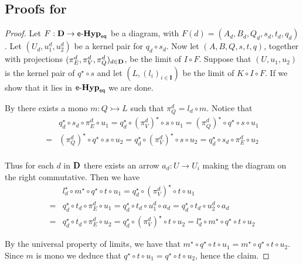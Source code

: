 \documentclass[3p]{elsarticle}
\newcommand{\cat}[1]{\ensuremath{\mathbf{#1}}}
\newcommand{\eq}{\mathsf{eq}}
\def\D{\textbf {\textup{D}}}
\newcommand{\catname}[1]{\textbf{\textup{#1}}}
\newcommand{\egg}{\mathsf{e}\text{-}\catname{Hyp}_\eq}
\newcommand{\mto}{\rightarrowtail}
\theoremstyle{remark}
\theoremstyle{definition}
\begin{document}
\subsection{Proofs for }
\elim*
\begin{proof}\label{proof:elim}
	Let $F: \D \to \egg$ be a diagram, with $F(d) = (A_d, B_d, Q_d, s_d, t_d, q_d)$.  Let $(U_d, u_1^d, u_2^d)$ be a kernel pair for $q_d\circ s_d$.
	Now let $(A, B, Q, s, t, q)$, together with projections $(\pi_E^d, \pi_V^d, \pi_Q^d)_{d\in \D}$, be the limit of $I \circ F$. Suppose that $(U, u_1, u_2)$ is the kernel pair of $q^\star\circ s$ and let $(L, (l_i)_{i \in \cat I})$ be the limit of $K \circ I \circ F$. If we show that it lies in $\egg$ we are done.
	
	By  there exists a mono $m\colon Q \mto L$ such that $\pi_Q^d = l_d \circ m$. Notice that
	\begin{align*}
		&q_d^\star \circ s_d\circ \pi^d_E\circ u_1  = q_d^\star\circ (\pi^d_V)^\star \circ s\circ u_1= (\pi_Q^d)^\star\circ q^\star\circ s\circ u_1\\=&(\pi_Q^d)^\star\circ q^\star\circ s\circ u_2= q_d^\star\circ (\pi^d_V)^\star\circ s\circ u_2=q_d^\star \circ s_d \circ \pi_E^d \circ u_2\\
	\end{align*}
\vspace{-1cm}

	\noindent 
	\begin{minipage}[l]{.7\linewidth}
	Thus for each $d$ in $\D$ there exists an arrow $a_d:U\to U_i$ making the diagram on the right commutative.
	Then we have
	\begin{align*}
		&l_d^\star\circ m^\star \circ q^\star \circ t \circ u_1    = q_d^\star\circ (\pi_V^d)^\star \circ t \circ u_1 \\
		= &q_d^\star \circ t_d \circ \pi_E^d \circ u_1
		= q_d^\star \circ t_d \circ u_1^d \circ a_d 
		= q_d^\star \circ t_d \circ u_2^d \circ a_d\\ 
		=& q_d^\star \circ t_d \circ \pi_E^d \circ u_2 = q_d^\star \circ (\pi_V^d)^\star \circ t \circ u_2 = l_d^\star \circ m^\star \circ q^\star \circ t \circ u_2
	\end{align*}
	\end{minipage}
\hfill
\begin{minipage}[r]{.3\linewidth}
\end{minipage}

	By the universal property of limits, we have that \- $m^\star\circ q^\star \circ t \circ u_1 = m^\star \circ q^\star \circ t \circ u_2$. Since $m$ is mono we deduce that $q^\star \circ t \circ u_1 = q^\star \circ t \circ u_2$, hence the claim.
\end{proof}
\end{document}

